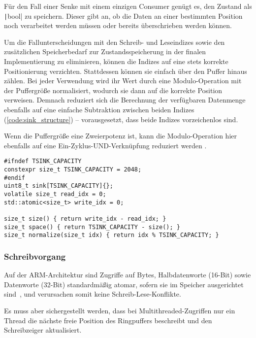 Für den Fall einer Senke mit einem einzigen Consumer genügt es, den Zustand als
\texttt|bool| zu speichern. Dieser gibt an, ob die Daten an einer
bestimmten Position noch verarbeitet werden müssen oder bereits überschrieben
werden können.

Um die Fallunterscheidungen mit den Schreib- und Leseindizes sowie den
zusätzlichen Speicherbedarf zur Zustandsspeicherung in der finalen
Implementierung zu eliminieren, können die Indizes auf eine stets korrekte
Positionierung verzichten. Stattdessen können sie einfach über den Puffer hinaus
zählen. Bei jeder Verwendung wird ihr Wert durch eine Modulo-Operation mit der
Puffergröße normalisiert, wodurch sie dann auf die korrekte Position verweisen.
Demnach reduziert sich die Berechnung der verfügbaren Datenmenge ebenfalls auf
eine einfache Subtraktion zwischen beiden Indizes (\ref{code:sink_structure}) --
vorausgesetzt, dass beide Indizes vorzeichenlos sind.

Wenn die Puffergröße eine Zweierpotenz ist, kann die Modulo-Operation hier
ebenfalls auf eine Ein-Zyklus-UND-Verknüpfung reduziert werden
\cite{stackoverflow_mod, arm_instruction_set}.

\begin{code}
\begin{verbatim}
#ifndef TSINK_CAPACITY
constexpr size_t TSINK_CAPACITY = 2048;
#endif
uint8_t sink[TSINK_CAPACITY]{};
volatile size_t read_idx = 0;
std::atomic<size_t> write_idx = 0;

size_t size() { return write_idx - read_idx; }
size_t space() { return TSINK_CAPACITY - size(); }
size_t normalize(size_t idx) { return idx % TSINK_CAPACITY; }
\end{verbatim}
    \label{code:sink_structure}
\end{code}

\subsubsection{Schreibvorgang}

Auf der ARM-Architektur sind Zugriffe auf Bytes, Halbdatenworte (16-Bit) sowie
Datenworte (32-Bit) standardmäßig atomar, sofern sie im Speicher ausgerichtet
sind~\cite[S. A3-79]{ARM_DDI0403_EE}, und verursachen somit keine
Schreib-Lese-Konflikte.

Es muss aber sichergestellt werden, dass bei Multithreaded-Zugriffen nur ein
Thread die nächste freie Position des Ringpuffers beschreibt und den
Schreibzeiger aktualisiert.

